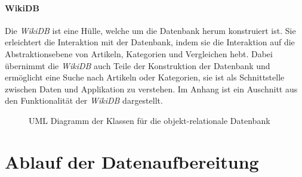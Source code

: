 \paragraph{WikiDB}
Die \emph{WikiDB} ist eine Hülle, welche um die Datenbank herum konstruiert ist.
Sie erleichtert die Interaktion mit der Datenbank, indem sie die Interaktion auf die Abstraktionsebene von Artikeln, Kategorien und Vergleichen hebt.
Dabei übernimmt die \emph{WikiDB} auch Teile der Konstruktion der Datenbank und ermöglicht eine Suche nach Artikeln oder Kategorien, sie ist als Schnittstelle zwischen Daten und Applikation zu verstehen.
Im Anhang ist ein Auschnitt aus den Funktionalität der \emph{WikiDB} dargestellt. 


\begin{figure}
\caption{UML Diagramm der Klassen für die objekt-relationale Datenbank}
\label{fig:uml-database}
\end{figure}

 
\section{Ablauf der Datenaufbereitung}
\label{subchap:date-pipeline}

